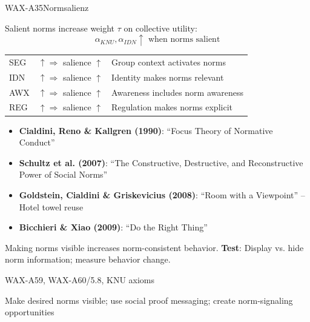 \begin{axiomspec}{WAX-A35}{Normsalienz}

Salient norms increase weight $\tau$ on collective utility:
\begin{equation}
\alpha_{KNU}, \alpha_{IDN} \uparrow \text{ when norms salient}
\end{equation}

\begin{tabular}{lll}
SEG & $\uparrow \Rightarrow$ salience $\uparrow$ & Group context activates norms \\
IDN & $\uparrow \Rightarrow$ salience $\uparrow$ & Identity makes norms relevant \\
AWX & $\uparrow \Rightarrow$ salience $\uparrow$ & Awareness includes norm awareness \\
REG & $\uparrow \Rightarrow$ salience $\uparrow$ & Regulation makes norms explicit \\
\end{tabular}

\begin{itemize}
\item \textbf{Cialdini, Reno \& Kallgren (1990)}: ``Focus Theory of Normative Conduct''
\item \textbf{Schultz et al. (2007)}: ``The Constructive, Destructive, and Reconstructive Power of Social Norms''
\item \textbf{Goldstein, Cialdini \& Griskevicius (2008)}: ``Room with a Viewpoint'' -- Hotel towel reuse
\item \textbf{Bicchieri \& Xiao (2009)}: ``Do the Right Thing''
\end{itemize}

Making norms visible increases norm-consistent behavior.
\textbf{Test}: Display vs. hide norm information; measure behavior change.

WAX-A59, WAX-A60/5.8, KNU axioms

Make desired norms visible; use social proof messaging; create norm-signaling opportunities

\end{axiomspec}


